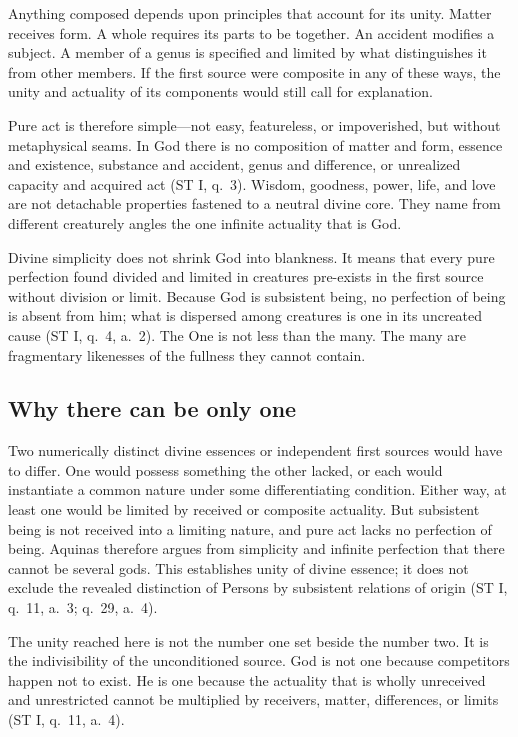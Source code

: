 Anything composed depends upon principles that account for its unity. Matter receives form. A whole requires its parts to be together. An accident modifies a subject. A member of a genus is specified and limited by what distinguishes it from other members. If the first source were composite in any of these ways, the unity and actuality of its components would still call for explanation.

Pure act is therefore simple---not easy, featureless, or impoverished, but without metaphysical seams. In God there is no composition of matter and form, essence and existence, substance and accident, genus and difference, or unrealized capacity and acquired act (ST I, q.~3). Wisdom, goodness, power, life, and love are not detachable properties fastened to a neutral divine core. They name from different creaturely angles the one infinite actuality that is God.

Divine simplicity does not shrink God into blankness. It means that every pure perfection found divided and limited in creatures pre-exists in the first source without division or limit. Because God is subsistent being, no perfection of being is absent from him; what is dispersed among creatures is one in its uncreated cause (ST I, q.~4, a.~2). The One is not less than the many. The many are fragmentary likenesses of the fullness they cannot contain.

\subsection{Why there can be only one}

Two numerically distinct divine essences or independent first sources would have to differ. One would possess something the other lacked, or each would instantiate a common nature under some differentiating condition. Either way, at least one would be limited by received or composite actuality. But subsistent being is not received into a limiting nature, and pure act lacks no perfection of being. Aquinas therefore argues from simplicity and infinite perfection that there cannot be several gods. This establishes unity of divine essence; it does not exclude the revealed distinction of Persons by subsistent relations of origin (ST I, q.~11, a.~3; q.~29, a.~4).

The unity reached here is not the number one set beside the number two. It is the indivisibility of the unconditioned source. God is not one because competitors happen not to exist. He is one because the actuality that is wholly unreceived and unrestricted cannot be multiplied by receivers, matter, differences, or limits (ST I, q.~11, a.~4).

